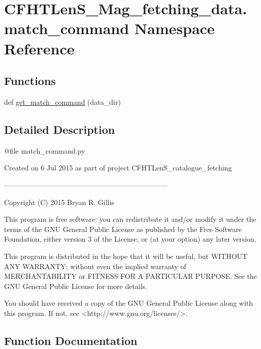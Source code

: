 \hypertarget{namespaceCFHTLenS__Mag__fetching__data_1_1match__command}{}\section{C\+F\+H\+T\+Len\+S\+\_\+\+Mag\+\_\+fetching\+\_\+data.\+match\+\_\+command Namespace Reference}
\label{namespaceCFHTLenS__Mag__fetching__data_1_1match__command}
\subsection*{Functions}
\begin{DoxyCompactItemize}
\item 
def \hyperlink{namespaceCFHTLenS__Mag__fetching__data_1_1match__command_af9867b989c53000f234a6b8f43410be6}{get\+\_\+match\+\_\+command} (data\+\_\+dir)
\end{DoxyCompactItemize}


\subsection{Detailed Description}
\begin{DoxyVerb}@file match_command.py

Created on 6 Jul 2015 as part of project CFHTLenS_catalogue_fetching

---------------------------------------------------------------------

Copyright (C) 2015  Bryan R. Gillis

This program is free software: you can redistribute it and/or modify
 it under the terms of the GNU General Public License as published by
 the Free Software Foundation, either version 3 of the License, or
 (at your option) any later version.

 This program is distributed in the hope that it will be useful,
 but WITHOUT ANY WARRANTY; without even the implied warranty of
 MERCHANTABILITY or FITNESS FOR A PARTICULAR PURPOSE.  See the
 GNU General Public License for more details.

You should have received a copy of the GNU General Public License
along with this program.  If not, see <http://www.gnu.org/licenses/>.\end{DoxyVerb}
 

\subsection{Function Documentation}
\hypertarget{namespaceCFHTLenS__Mag__fetching__data_1_1match__command_af9867b989c53000f234a6b8f43410be6}{}
